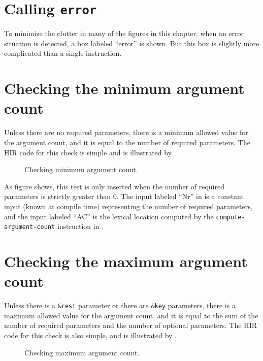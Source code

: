 \section{Calling \texttt{error}}

To minimize the clutter in many of the figures in this chapter, when
an error situation is detected, a box labeled ``error'' is shown.  But
this box is slightly more complicated than a single instruction.

\section{Checking the minimum argument count}

Unless there are no required parameters, there is a minimum allowed
value for the argument count, and it is equal to the number of
required parameters.  The HIR code for this check is simple and is
illustrated by .

\begin{figure}
\begin{center}
\end{center}
\caption{\label{fig-check-minimum-argument-count}
Checking minimum argument count.}
\end{figure}

As figure  shows, this test is only
inserted when the number of required parameters is strictly greater
than $0$.  The input labeled ``Nr'' in
 is a constant input (known
at compile time) representing the number of required parameters, and
the input labeled ``AC'' is the lexical location computed by the
\texttt{compute-argument-count} instruction in
.

\section{Checking the maximum argument count}

Unless there is a \texttt{\&rest} parameter or there are
\texttt{\&key} parameters, there is a maximum allowed value for the
argument count, and it is equal to the sum of the number of required
parameters and the number of optional parameters.  The HIR code for
this check is also simple, and is illustrated by
.

\begin{figure}
\begin{center}
\end{center}
\caption{\label{fig-check-maximum-argument-count}
Checking maximum argument count.}
\end{figure}

